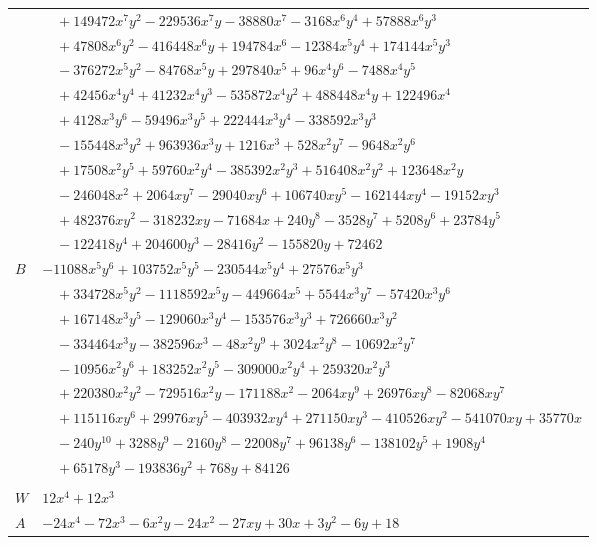 \documentclass[11pt]{article}
\begin{document}
\begin{longtable}{@{}ll@{}}
 & $\quad +149472x^{7}y^{2}-229536x^{7}y-38880x^{7}-3168x^{6}y^{4}+57888x^{6}y^{3}$\\
 & $\quad +47808x^{6}y^{2}-416448x^{6}y+194784x^{6}-12384x^{5}y^{4}+174144x^{5}y^{3}$\\
 & $\quad -376272x^{5}y^{2}-84768x^{5}y+297840x^{5}+96x^{4}y^{6}-7488x^{4}y^{5}$\\
 & $\quad +42456x^{4}y^{4}+41232x^{4}y^{3}-535872x^{4}y^{2}+488448x^{4}y+122496x^{4}$\\
 & $\quad +4128x^{3}y^{6}-59496x^{3}y^{5}+222444x^{3}y^{4}-338592x^{3}y^{3}$\\
 & $\quad -155448x^{3}y^{2}+963936x^{3}y+1216x^{3}+528x^{2}y^{7}-9648x^{2}y^{6}$\\
 & $\quad +17508x^{2}y^{5}+59760x^{2}y^{4}-385392x^{2}y^{3}+516408x^{2}y^{2}+123648x^{2}y$\\
 & $\quad -246048x^{2}+2064xy^{7}-29040xy^{6}+106740xy^{5}-162144xy^{4}-19152xy^{3}$\\
 & $\quad +482376xy^{2}-318232xy-71684x+240y^{8}-3528y^{7}+5208y^{6}+23784y^{5}$\\
 & $\quad -122418y^{4}+204600y^{3}-28416y^{2}-155820y+72462$\\
$B$ & $-11088x^{5}y^{6}+103752x^{5}y^{5}-230544x^{5}y^{4}+27576x^{5}y^{3}$\\
 & $\quad +334728x^{5}y^{2}-1118592x^{5}y-449664x^{5}+5544x^{3}y^{7}-57420x^{3}y^{6}$\\
 & $\quad +167148x^{3}y^{5}-129060x^{3}y^{4}-153576x^{3}y^{3}+726660x^{3}y^{2}$\\
 & $\quad -334464x^{3}y-382596x^{3}-48x^{2}y^{9}+3024x^{2}y^{8}-10692x^{2}y^{7}$\\
 & $\quad -10956x^{2}y^{6}+183252x^{2}y^{5}-309000x^{2}y^{4}+259320x^{2}y^{3}$\\
 & $\quad +220380x^{2}y^{2}-729516x^{2}y-171188x^{2}-2064xy^{9}+26976xy^{8}-82068xy^{7}$\\
 & $\quad +115116xy^{6}+29976xy^{5}-403932xy^{4}+271150xy^{3}-410526xy^{2}-541070xy+35770x$\\
 & $\quad -240y^{10}+3288y^{9}-2160y^{8}-22008y^{7}+96138y^{6}-138102y^{5}+1908y^{4}$\\
 & $\quad +65178y^{3}-193836y^{2}+768y+84126$\\
\addlinespace[3pt]
\multicolumn{2}{@{}l}{$i=38$, $m=3$, neighbours $8,60,75,87$}\\
$W$ & $12x^{4}+12x^{3}$\\
$A$ & $-24x^{4}-72x^{3}-6x^{2}y-24x^{2}-27xy+30x+3y^{2}-6y+18$\\

\end{longtable}
\end{document}
